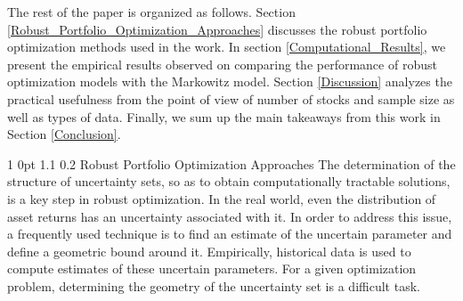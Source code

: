 \documentclass[12pt]{article}
\makeatletter
\numberwithin{equation}{section}
\renewcommand{\section}{
  \@startsection
  {section}%
  {1}%
  {0pt}%
  {1.1\baselineskip}%
  {0.2\baselineskip}%
  {\sc \centering}%
}
\makeatother
\begin{document}
The rest of the paper is organized as follows. Section \ref{Robust_Portfolio_Optimization_Approaches} discusses the robust portfolio optimization methods used in the work. In section \ref{Computational_Results}, we present the empirical results observed on comparing the performance of robust optimization models with the Markowitz model. Section \ref{Discussion} analyzes the practical usefulness from the point of view of number of stocks and sample size as well as types of data. Finally, we sum up the main takeaways from this work in Section \ref{Conclusion}.

\section{Robust Portfolio Optimization Approaches}
\label{Robust_Portfolio_Optimization_Approaches}
The determination of the structure of uncertainty sets, so as to obtain computationally tractable solutions, is a key step in robust optimization. In the real world, even the distribution of asset returns has an uncertainty associated with it. In order to address this issue, a frequently used technique is to find an estimate of the uncertain parameter and define a geometric bound around it. Empirically, historical data is used to compute estimates of these uncertain parameters. For a given optimization problem, determining the geometry of the uncertainty set is a difficult task. 
\end{document}
